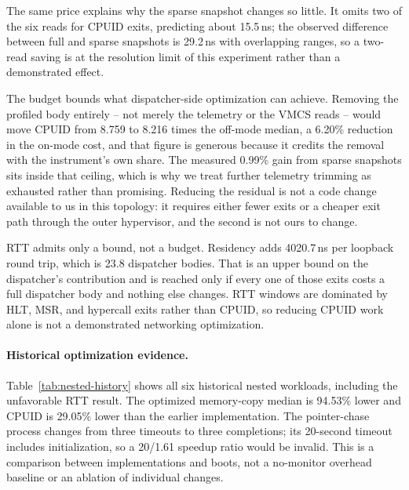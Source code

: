 The same price explains why the sparse snapshot changes so little. It omits two
of the six reads for CPUID exits, predicting about 15.5\,ns; the observed
difference between full and sparse snapshots is 29.2\,ns with overlapping ranges,
so a two-read saving is at the resolution limit of this experiment rather than a
demonstrated effect.

The budget bounds what dispatcher-side optimization can achieve. Removing the
profiled body entirely -- not merely the telemetry or the VMCS reads -- would
move CPUID from 8.759 to 8.216 times the off-mode median, a 6.20\% reduction in
the on-mode cost, and that figure is generous because it credits the removal with
the instrument's own share. The measured 0.99\% gain from sparse snapshots sits
inside that ceiling, which is why we treat further telemetry trimming as
exhausted rather than promising. Reducing the residual is not a code change
available to us in this topology: it requires either fewer exits or a cheaper
exit path through the outer hypervisor, and the second is not ours to change.

RTT admits only a bound, not a budget. Residency adds 4020.7\,ns per loopback
round trip, which is 23.8 dispatcher bodies. That is an upper bound on the
dispatcher's contribution and is reached only if every one of those exits costs
a full dispatcher body and nothing else changes. RTT windows are dominated by
HLT, MSR, and hypercall exits rather than CPUID, so reducing CPUID work alone is
not a demonstrated networking optimization.

\paragraph{Historical optimization evidence.}
Table~\ref{tab:nested-history} shows all six historical nested workloads,
including the unfavorable RTT result. The optimized memory-copy median is
94.53\% lower and CPUID is 29.05\% lower than the earlier implementation.
The pointer-chase process changes from three timeouts to three completions;
its 20-second timeout includes initialization, so a 20/1.61 speedup ratio would
be invalid. This is a comparison between implementations and boots, not a
no-monitor overhead baseline or an ablation of individual changes.

\begin{table}[tbp]
\centering\small
\caption{Historical TinyCore implementation comparison, three measured runs
per workload after warmup, same workload binary and guest CPU affinity.
Negative elapsed change means a shorter duration. Driver and guest boot differ.}
\label{tab:nested-history}

\end{table}

